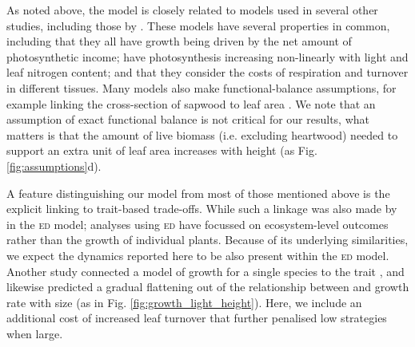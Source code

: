 \documentclass[9pt,twocolumn,twoside,lineno]{pnas-new}
\begin{document}
As noted above, the {\plant} model is closely related to models used in several other studies, including those by \citep{Givnish-1988, Yokozawa-1995, Makela-1997, King-1999, King-2005, Moorcroft-2001, Li-2014}. These models have several properties in common, including that they all have growth being driven by the net amount of photosynthetic income; have photosynthesis increasing non-linearly with light and leaf nitrogen content; and that they consider the costs of respiration and turnover in different tissues. Many models also make functional-balance assumptions, for example linking the cross-section of sapwood to leaf area \citep{Givnish-1988, Yokozawa-1995, Makela-1997, King-2005, Moorcroft-2001}. We note that an assumption of exact functional balance is not critical for our results, what matters is that the amount of live biomass (i.e. excluding heartwood) needed to support an extra unit of leaf area increases with height (as Fig. \ref{fig:assumptions}d).

A feature distinguishing our model from most of those mentioned above is the explicit linking to trait-based trade-offs. While such a linkage was also made by \citep{Moorcroft-2001} in the \textsc{ed} model; analyses using \textsc{ed} have focussed on ecosystem-level outcomes rather than the growth of individual plants. Because of its underlying similarities, we expect the dynamics reported here to be also present within the \textsc{ed} model. Another study \citep{King-1999} connected a model of growth for a single species to the trait {\lma}, and likewise predicted a gradual flattening out of the relationship between {\lma} and growth rate with size (as in Fig. \ref{fig:growth_light_height}). Here, we include an additional cost of increased leaf turnover that further penalised low {\lma} strategies when large.
\end{document}
